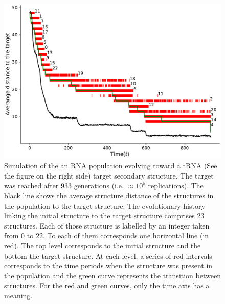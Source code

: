 \begin{figure}[t!]
	\includegraphics[width=1.0\linewidth]{../res/images/continuity_RNAfold.pdf}
	\caption{Simulation of the an RNA population evolving toward a tRNA (See the figure on the right side) target secondary structure. The target was reached after $933$ generations (i.e. $\approx 10^5$ replications). The black line shows the average structure distance of the structures in the population to the target structure.  The evolutionary history linking the initial structure to the target structure comprises $23$ structures. Each of those structure is labelled by an integer taken from $0$ to $22$. To each of them corresponds one horizontal line (in red). The top level corresponds to the initial structure and the bottom the target structure. At each level, a series of red intervals corresponds to the time periods when the structure was present in the population and the green curve represents the transition between structures. For the red and green curves, only the time axis has a meaning. }
	\label{fig:contiuity}
\end{figure}
